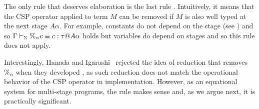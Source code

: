 The only rule that deserves elaboration is the last rule \QPercent.
Intuitively, it means that the CSP operator applied to term $M$ can be
removed if $M$ is also well typed at the next stage \(A\alpha\).
For example, constants do not depend on the stage (see \TConst) and
so \(\Gamma\vdash_\Sigma \%_\alpha c \equiv c : \tau @ A\alpha\) holds but variables
do depend on stages and so this rule does not apply.

Interestingly, Hanada and Igarashi~\cite{Hanada2014} rejected the idea of
reduction that removes $\%_\alpha$ when they developed \LTP{}, as such
reduction does not match the operational behavior of the CSP operator
in implementation.  However, as an equational system for multi-stage
programs, the rule \QPercent makes sense and, as we argue next,
it is practically significant.


